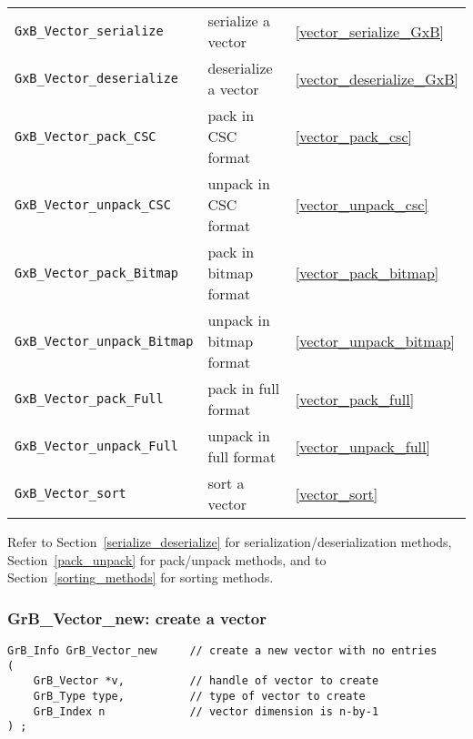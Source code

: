 \documentclass[12pt]{article}
\begin{document}
{{\begin{tabular}{lll}
\hline
\hline
\verb'GxB_Vector_serialize'      & serialize a vector               & \ref{vector_serialize_GxB} \\
\verb'GxB_Vector_deserialize'    & deserialize a vector             & \ref{vector_deserialize_GxB} \\
\hline
\hline
\verb'GxB_Vector_pack_CSC'         & pack in CSC format      & \ref{vector_pack_csc} \\
\verb'GxB_Vector_unpack_CSC'       & unpack in CSC format    & \ref{vector_unpack_csc} \\
\hline
\verb'GxB_Vector_pack_Bitmap'      & pack in bitmap format   & \ref{vector_pack_bitmap} \\
\verb'GxB_Vector_unpack_Bitmap'    & unpack in bitmap format & \ref{vector_unpack_bitmap} \\
\hline
\verb'GxB_Vector_pack_Full'        & pack in full format     & \ref{vector_pack_full} \\
\verb'GxB_Vector_unpack_Full'      & unpack in full format   & \ref{vector_unpack_full} \\
\hline
\hline
\verb'GxB_Vector_sort'          & sort a vector & \ref{vector_sort} \\
\end{tabular}
}

\vspace{0.2in}
Refer to
Section~\ref{serialize_deserialize} for serialization/deserialization methods,
Section~\ref{pack_unpack} for pack/unpack methods,
and to
Section~\ref{sorting_methods} for sorting methods.

\newpage
\subsubsection{{\sf GrB\_Vector\_new:}           create a vector}
\label{vector_new}

\begin{mdframed}[userdefinedwidth=6in]
{\footnotesize
\begin{verbatim}
GrB_Info GrB_Vector_new     // create a new vector with no entries
(
    GrB_Vector *v,          // handle of vector to create
    GrB_Type type,          // type of vector to create
    GrB_Index n             // vector dimension is n-by-1
) ;
\end{verbatim}
} \end{mdframed}

}
\end{document}
